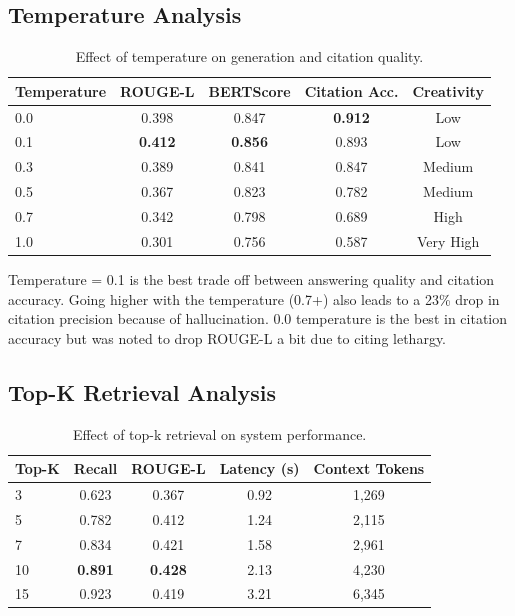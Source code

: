 \documentclass[runningheads]{llncs}
\begin{document}
\subsection{Temperature Analysis}

\begin{table}[h]
\centering
\caption{Effect of temperature on generation and citation quality.}
\label{tab:temperature_ablation}
\begin{tabular}{lcccc}
\toprule
\textbf{Temperature} & \textbf{ROUGE-L} & \textbf{BERTScore} & \textbf{Citation Acc.} & \textbf{Creativity} \\
\midrule
0.0 & 0.398 & 0.847 & \textbf{0.912} & Low \\
0.1 & \textbf{0.412} & \textbf{0.856} & 0.893 & Low \\
0.3 & 0.389 & 0.841 & 0.847 & Medium \\
0.5 & 0.367 & 0.823 & 0.782 & Medium \\
0.7 & 0.342 & 0.798 & 0.689 & High \\
1.0 & 0.301 & 0.756 & 0.587 & Very High \\
\bottomrule
\end{tabular}
\end{table}

Temperature = 0.1 is the best trade off between answering quality and citation accuracy. Going higher with the temperature (0.7+) also leads to a 23\% drop in citation precision because of hallucination. 0.0 temperature is the best in citation accuracy but was noted to drop ROUGE-L a bit due to citing lethargy.




\subsection{Top-K Retrieval Analysis}

\begin{table}[h]
\centering
\caption{Effect of top-k retrieval on system performance.}
\label{tab:topk_ablation}
\begin{tabular}{lcccc}
\toprule
\textbf{Top-K} & \textbf{Recall} & \textbf{ROUGE-L} & \textbf{Latency (s)} & \textbf{Context Tokens} \\
\midrule
3 & 0.623 & 0.367 & 0.92 & 1,269 \\
5 & 0.782 & 0.412 & 1.24 & 2,115 \\
7 & 0.834 & 0.421 & 1.58 & 2,961 \\
10 & \textbf{0.891} & \textbf{0.428} & 2.13 & 4,230 \\
15 & 0.923 & 0.419 & 3.21 & 6,345 \\
\bottomrule
\end{tabular}
\end{table}
\end{document}
